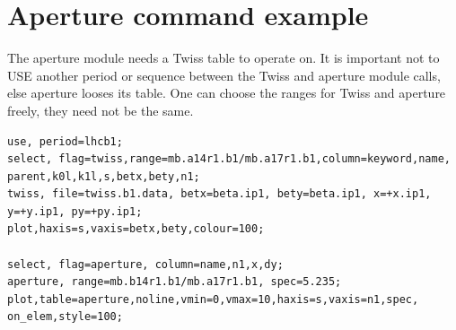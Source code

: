 



\section{Aperture command example}
\label{sec:aperexample}
The aperture module needs a Twiss table to operate on. It is important
not to USE another period or sequence between the Twiss and aperture
module calls, else aperture looses its table. One can choose the ranges
for Twiss and aperture freely, they need not be the same.  

\begin{verbatim}
use, period=lhcb1;
select, flag=twiss,range=mb.a14r1.b1/mb.a17r1.b1,column=keyword,name,
parent,k0l,k1l,s,betx,bety,n1;
twiss, file=twiss.b1.data, betx=beta.ip1, bety=beta.ip1, x=+x.ip1, 
y=+y.ip1, py=+py.ip1;
plot,haxis=s,vaxis=betx,bety,colour=100;

select, flag=aperture, column=name,n1,x,dy;
aperture, range=mb.b14r1.b1/mb.a17r1.b1, spec=5.235;
plot,table=aperture,noline,vmin=0,vmax=10,haxis=s,vaxis=n1,spec,
on_elem,style=100;
\end{verbatim}


